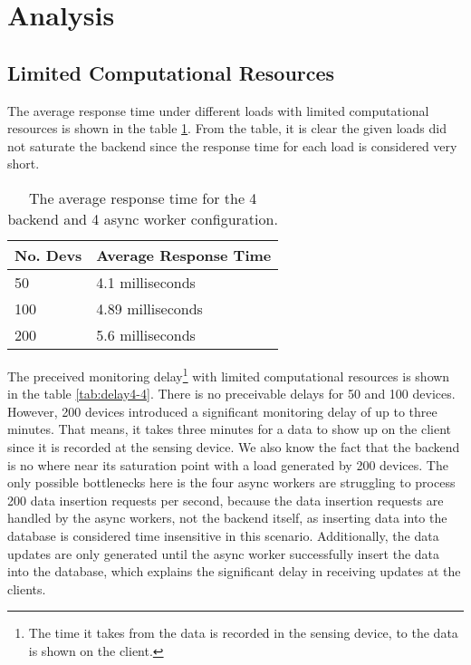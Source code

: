 \documentclass[../thesis.tex]{subfiles}
\begin{document}
\section{Analysis}

\subsection{Limited Computational Resources}

The average response time under different loads with limited computational resources is shown in the table \ref{tab:avg4-4}. From the table, it is clear the given loads did not saturate the backend since the response time for each load is considered very short. 

\begin{table}[h!]
	\begin{center}
		\caption{The average response time for the 4 backend and 4 async worker configuration.}
		\label{tab:avg4-4}
		\begin{tabular}{l|l}
			\toprule
			\textbf{No. Devs} & \textbf{Average Response Time}\\
			\midrule
			50 & 4.1 milliseconds\\
			100 & 4.89 milliseconds\\
			200 & 5.6 milliseconds\\
			\bottomrule
		\end{tabular}
	\end{center}
\end{table}

The preceived monitoring delay\footnote{The time it takes from the data is recorded in the sensing device, to the data is shown on the client.} with limited computational resources is shown in the table \ref{tab:delay4-4}. There is no preceivable delays for 50 and 100 devices. However, 200 devices introduced a significant monitoring delay of up to three minutes. That means, it takes three minutes for a data to show up on the client since it is recorded at the sensing device. We also know the fact that the backend is no where near its saturation point with a load generated by 200 devices. The only possible bottlenecks here is the four async workers are struggling to process 200 data insertion requests per second, because the data insertion requests are handled by the async workers, not the backend itself, as inserting data into the database is considered time insensitive in this scenario. Additionally, the data updates are only generated until the async worker successfully insert the data into the database, which explains the significant delay in receiving updates at the clients. 
\end{document}
